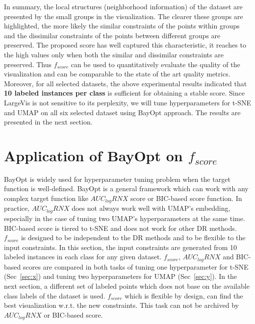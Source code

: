 In summary, the local structures (neighborhood information) of the dataset are presented by the small groups in the visualization.
The clearer these groups are highlighted, the more likely the similar constraints of the points within groups and the dissimilar constraints of the points between different groups are preserved.
The proposed score has well captured this characteristic,  it reaches to the high values only when both the similar and dissimilar constraints are preserved.
Thus $f_{score}$ can be used to quantitatively evaluate the quality of the visualization and can be comparable to the state of the art quality metrics.
Moreover, for all selected datasets, the above experimental results indicated that {\bf 10 labeled instances per class} is sufficient for obtaining a stable score.
Since LargeVis is not sensitive to its perplexity, we will tune hyperparameters for t-SNE and UMAP on all six selected dataset using BayOpt approach.
The results are presented in the next section.


\section{Application of BayOpt on $f_{score}$}\label{sec:result:bo}
BayOpt is widely used for hyperparameter tuning problem when the target function is well-defined.
BayOpt is a general framework which can work with any complex target function like $AUC_{log}RNX$ score or BIC-based score function.
In practice, $AUC_{log}RNX$ does not always work well with UMAP's embedding, especially in the case of tuning two UMAP's hyperparameters at the same time.
BIC-based score is tiered to t-SNE and does not work for other DR methods.
$f_{score}$ is designed to be independent to the DR methods and to be flexible to the input constraints.
In this section, the input constraints are generated from 10 labeled instances in each class for any given dataset.
$f_{score}$, $AUC_{log}RNX$ and BIC-based scores are compared in both tasks of tuning one hyperparameter for t-SNE (Sec~\ref{sec:x}) and tuning two hyperparameters for UMAP (Sec~\ref{sec:y}).
In the next section, a different set of labeled points which does not base on the available class labels of the dataset is used.
$f_{score}$ which is flexible by design, can find the best visualization w.r.t. the new constraints.
This task can not be archived by $AUC_{log}RNX$ or BIC-based score.

